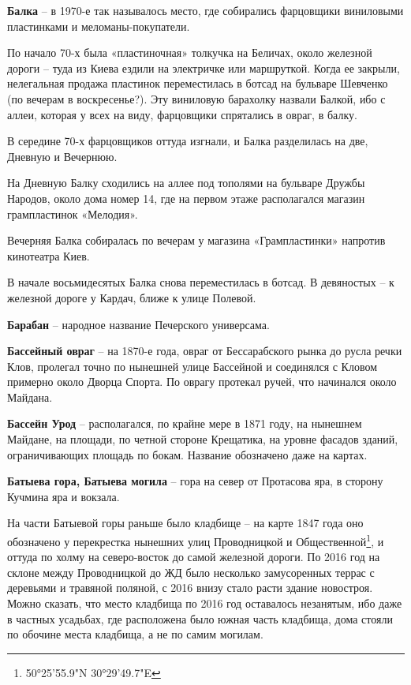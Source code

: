 \medskip


\textbf{Балка} – в 1970-е так называлось место, где собирались фарцовщики виниловыми пластинками и меломаны-покупатели. 

По начало 70-х была «пластиночная» толкучка на Беличах, около железной дороги – туда из Киева ездили на электричке или маршруткой. Когда ее закрыли, нелегальная продажа пластинок переместилась в ботсад на бульваре Шевченко (по вечерам в воскресенье?). Эту виниловую барахолку назвали Балкой, ибо с аллеи, которая у всех на виду, фарцовщики спрятались в овраг, в балку.

В середине 70-х фарцовщиков оттуда изгнали, и Балка разделилась на две, Дневную и Вечернюю.

На Дневную Балку сходились на аллее под тополями на бульваре Дружбы Народов, около дома номер 14, где на первом этаже располагался магазин грампластинок «Мелодия».

Вечерняя Балка собиралась по вечерам у магазина «Грампластинки» напротив кинотеатра Киев.

В начале восьмидесятых Балка снова переместилась в ботсад. В девяностых – к железной дороге у Кардач, ближе к улице Полевой.\\


\medskip

\textbf{Барабан} – народное название Печерского универсама.\\

\medskip

\textbf{Бассейный овраг} – на 1870-е года, овраг от Бессарабского рынка до русла речки Клов, пролегал точно по нынешней улице Бассейной и соединялся с Кловом примерно около Дворца Спорта. По оврагу протекал ручей, что начинался около Майдана.\\

\medskip

\textbf{Бассейн Урод} – располагался, по крайне мере в 1871 году, на нынешнем Майдане, на площади, по четной стороне Крещатика, на уровне фасадов зданий, ограничивающих площадь по бокам. Название обозначено даже на картах.\\


\medskip


\textbf{Батыева гора, Батыева могила} –  гора на север от Протасова яра, в сторону Кучмина яра и вокзала.

На части Батыевой горы раньше было кладбище – на карте 1847 года оно обозначено у перекрестка нынешних улиц Проводницкой и Общественной\footnote{50°25'55.9"N 30°29'49.7"E}, и оттуда по холму на северо-восток до самой железной дороги. По 2016 год на склоне между Проводницкой до ЖД было несколько замусоренных террас с деревьями и травяной поляной, с 2016 внизу стало расти здание новостроя. Можно сказать, что место кладбища по 2016 год оставалось незанятым, ибо даже в частных усадьбах, где расположена было южная часть кладбища, дома стояли по обочине места кладбища, а не по самим могилам.

